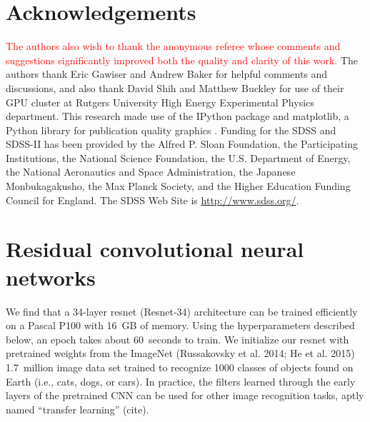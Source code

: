 \documentclass[fleqn,usenatbib]{mnras}
\newcommand{\editorial}[1]{\textcolor{red}{#1}}
\begin{document}
\section*{Acknowledgements}
\editorial{The authors also wish to thank the anonymous referee whose comments and suggestions significantly improved both the quality and clarity of this work.}
The authors thank Eric Gawiser and Andrew Baker for helpful comments and discussions, and also thank David Shih and Matthew Buckley for use of their GPU cluster at Rutgers University High Energy Experimental Physics department. %
This research made use of the {\sc IPython} package \citep{Perez2007} and {\sc matplotlib}, a Python library for publication quality graphics \citep{Hunter2007}. Funding for the SDSS and SDSS-II has been provided by the Alfred P. Sloan Foundation, the Participating Institutions, the National Science Foundation, the U.S. Department of Energy, the National Aeronautics and Space Administration, the Japanese Monbukagakusho, the Max Planck Society, and the Higher Education Funding Council for England. The SDSS Web Site is \url{http://www.sdss.org/}.



\appendix
%
\section{Residual convolutional neural networks}
%



We find that a 34-layer resnet (Resnet-34) architecture can be trained efficiently on a Pascal P100 with 16~GB of memory.
Using the hyperparameters described below, an epoch takes about 60~seconds to train.
We initialize our resnet with pretrained weights from the ImageNet (Russakovsky et al. 2014; He et al. 2015) 1.7~million image data set trained to recognize 1000 classes of objects found on Earth (i.e., cats, dogs, or cars).
In practice, the filters learned through the early layers of the pretrained CNN can be used for other image recognition tasks, aptly named ``transfer learning'' (cite).
\end{document}
